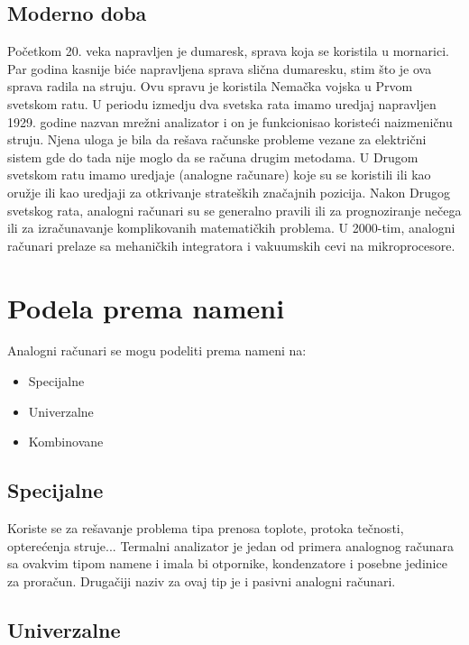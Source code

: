 \documentclass[a4paper]{article}
\begin{document}
{\pagebreak

\subsection{Moderno doba}
\label{subsec:podnaslovM}

Početkom 20. veka napravljen je dumaresk, sprava koja se koristila u mornarici. Par godina kasnije biće napravljena sprava slična dumaresku, stim što je ova sprava radila na struju. Ovu spravu je koristila Nemačka vojska u Prvom svetskom ratu. U periodu izmedju dva svetska rata imamo uredjaj napravljen 1929. godine nazvan mrežni analizator i on je funkcionisao koristeći naizmeničnu struju. Njena uloga je bila da rešava računske probleme vezane za električni sistem gde do tada nije moglo da se računa drugim metodama. U Drugom svetskom ratu imamo uredjaje (analogne računare) koje su se koristili ili kao oružje ili kao uredjaji za otkrivanje strateških značajnih pozicija. Nakon Drugog svetskog rata, analogni računari su se generalno pravili ili za prognoziranje nečega ili za izračunavanje komplikovanih matematičkih problema. U 2000-tim, analogni računari prelaze sa mehaničkih integratora i vakuumskih cevi na mikroprocesore.

\section{Podela prema nameni}
\label{sec:naslovcic}

Analogni računari se mogu podeliti prema nameni na:
	\begin{itemize}
		\item Specijalne
		\item Univerzalne
		\item Kombinovane
	\end{itemize}

\subsection{Specijalne}
\label{subsec:podnaslovS}

Koriste se za rešavanje problema tipa prenosa toplote, protoka tečnosti, opterećenja struje... Termalni analizator je jedan od primera analognog računara sa ovakvim tipom namene i imala bi otpornike, kondenzatore i posebne jedinice za proračun. Drugačiji naziv za ovaj tip je i pasivni analogni računari.

\subsection{Univerzalne}
\label{subsec:podnaslovU}

}
\end{document}
